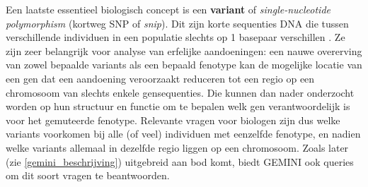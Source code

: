 Een laatste essentieel biologisch concept is een \textbf{variant} of \textit{single-nucleotide polymorphism} (kortweg SNP of \textit{snip}). Dit zijn korte sequenties DNA die tussen verschillende individuen in een populatie slechts op 1 basepaar verschillen \cite{alberts2007molecular}. Ze zijn zeer belangrijk voor analyse van erfelijke aandoeningen: een nauwe overerving van zowel bepaalde variants als een bepaald fenotype kan de mogelijke locatie van een gen dat een aandoening veroorzaakt reduceren tot een regio op een chromosoom van slechts enkele gensequenties. Die kunnen dan nader onderzocht worden op hun structuur en functie om te bepalen welk gen verantwoordelijk is voor het gemuteerde fenotype. Relevante vragen voor biologen zijn dus welke variants voorkomen bij alle (of veel) individuen met eenzelfde fenotype, en nadien welke variants allemaal in dezelfde regio liggen op een chromosoom. Zoals later (zie \ref{gemini_beschrijving}) uitgebreid aan bod komt, biedt GEMINI ook queries om dit soort vragen te beantwoorden.\\

